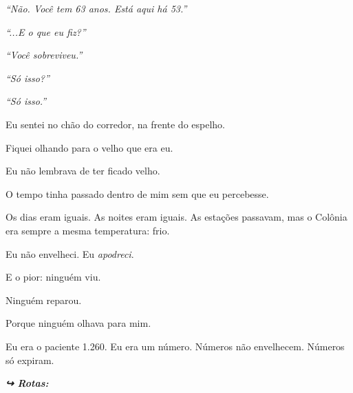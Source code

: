 \noindent \textit{\textquotedblleft{}Não. Você tem 63 anos. Está aqui há 53.\textquotedblright{}}

\noindent \textit{\textquotedblleft{}...E o que eu fiz?\textquotedblright{}}

\noindent \textit{\textquotedblleft{}Você sobreviveu.\textquotedblright{}}

\noindent \textit{\textquotedblleft{}Só isso?\textquotedblright{}}

\noindent \textit{\textquotedblleft{}Só isso.\textquotedblright{}}

\noindent Eu sentei no chão do corredor, na frente do espelho.

\noindent Fiquei olhando para o velho que era eu.

\noindent Eu não lembrava de ter ficado velho.

\noindent O tempo tinha passado dentro de mim sem que eu percebesse.

\noindent Os dias eram iguais. As noites eram iguais. As estações passavam, mas o Colônia era sempre a mesma temperatura: frio.

\noindent Eu não envelheci.
Eu \textit{apodreci}.

\noindent E o pior: ninguém viu.

\noindent Ninguém reparou.

\noindent Porque ninguém olhava para mim.

\noindent Eu era o paciente 1.260.
Eu era um número.
Números não envelhecem.
Números só expiram.

\vspace{0.5em}
\noindent\textit{\textbf{↪ Rotas:}  \rotasep {}}